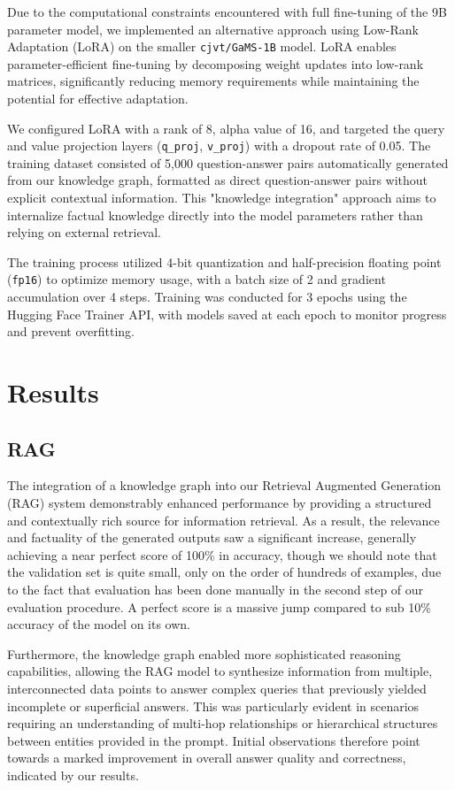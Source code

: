 \documentclass[fleqn,moreauthors,10pt]{ds_report}
\begin{document}
Due to the computational constraints encountered with full fine-tuning of the 9B parameter model, we implemented an alternative approach using Low-Rank Adaptation (LoRA) on the smaller \texttt{cjvt/GaMS-1B} model. LoRA enables parameter-efficient fine-tuning by decomposing weight updates into low-rank matrices, significantly reducing memory requirements while maintaining the potential for effective adaptation.

We configured LoRA with a rank of 8, alpha value of 16, and targeted the query and value projection layers (\texttt{q\_proj}, \texttt{v\_proj}) with a dropout rate of 0.05. The training dataset consisted of 5,000 question-answer pairs automatically generated from our knowledge graph, formatted as direct question-answer pairs without explicit contextual information. This "knowledge integration" approach aims to internalize factual knowledge directly into the model parameters rather than relying on external retrieval.

The training process utilized 4-bit quantization and half-precision floating point (\texttt{fp16}) to optimize memory usage, with a batch size of 2 and gradient accumulation over 4 steps. Training was conducted for 3 epochs using the Hugging Face Trainer API, with models saved at each epoch to monitor progress and prevent overfitting.

\section*{Results}

\subsection*{RAG}

The integration of a knowledge graph into our Retrieval Augmented Generation (RAG) system demonstrably enhanced performance by providing a structured and contextually rich source for information retrieval. As a result, the relevance and factuality of the generated outputs saw a significant increase, generally achieving a near perfect score of 100\% in accuracy, though we should note that the validation set is quite small, only on the order of hundreds of examples, due to the fact that evaluation has been done manually in the second step of our evaluation procedure. A perfect score is a massive jump compared to sub 10\% accuracy of the model on its own.

Furthermore, the knowledge graph enabled more sophisticated reasoning capabilities, allowing the RAG model to synthesize information from multiple, interconnected data points to answer complex queries that previously yielded incomplete or superficial answers. This was particularly evident in scenarios requiring an understanding of multi-hop relationships or hierarchical structures between entities provided in the prompt. Initial observations therefore point towards a marked improvement in overall answer quality and correctness, indicated by our results.
\end{document}
